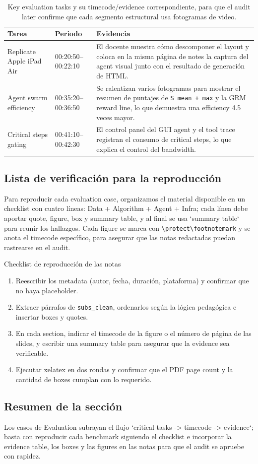 \begin{table}[H]
\footnotesize
\centering
\begin{tabular}{p{3cm}p{4cm}p{5cm}}
\toprule
Tarea & Periodo & Evidencia \\
\midrule
Replicate Apple iPad Air & 00:20:50--00:22:10 & El docente muestra cómo descomponer el layout y coloca en la misma página de notes la captura del agent visual junto con el resultado de generación de HTML. \\
Agent swarm efficiency & 00:35:20--00:36:50 & Se ralentizan varios fotogramas para mostrar el resumen de puntajes de \texttt{S mean + max} y la GRM reward line, lo que demuestra una efficiency 4.5 veces mayor. \\
Critical steps gating & 00:41:10--00:42:30 & El control panel del GUI agent y el tool trace registran el consumo de critical steps, lo que explica el control del bandwidth. \\
\bottomrule
\end{tabular}
\caption{Key evaluation tasks y su timecode/evidence correspondiente, para que el audit later confirme que cada segmento estructural usa fotogramas de video.}
\end{table}

\subsection{Lista de verificación para la reproducción}
Para reproducir cada evaluation case, organizamos el material disponible en un checklist con cuatro líneas: Data + Algorithm + Agent + Infra; cada línea debe aportar quote, figure, box y summary table, y al final se usa `summary table` para reunir los hallazgos. Cada figure se marca con \verb|\protect\footnotemark| y se anota el timecode específico, para asegurar que las notas redactadas puedan rastrearse en el audit.

\begin{importantbox}{Checklist de reproducción de las notas}
\begin{enumerate}
    \item Reescribir los metadata (autor, fecha, duración, plataforma) y confirmar que no haya placeholder.
    \item Extraer párrafos de \texttt{subs\_clean}, ordenarlos según la lógica pedagógica e insertar boxes y quotes.
    \item En cada section, indicar el timecode de la figure o el número de página de las slides, y escribir una summary table para asegurar que la evidence sea verificable.
    \item Ejecutar xelatex en dos rondas y confirmar que el PDF page count y la cantidad de boxes cumplan con lo requerido.
\end{enumerate}
\end{importantbox}

\subsection{Resumen de la sección}
Los casos de Evaluation subrayan el flujo `critical tasks -> timecode -> evidence`; basta con reproducir cada benchmark siguiendo el checklist e incorporar la evidence table, los boxes y las figures en las notas para que el audit se apruebe con rapidez.

